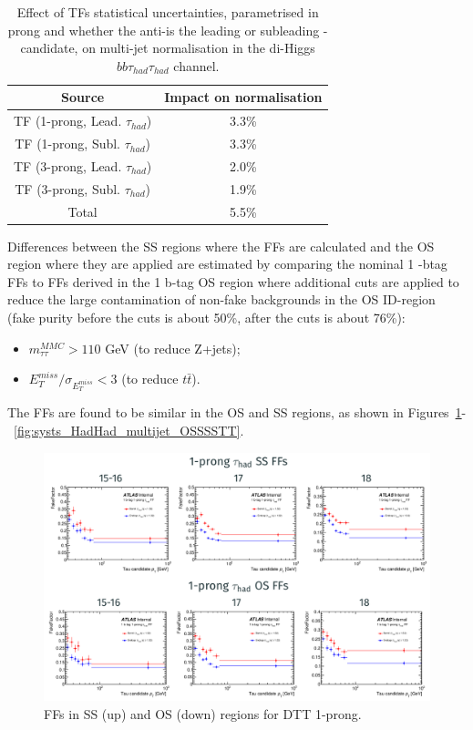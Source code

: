 \begin{table}
\centering
\small
\begin{tabular}{|c|c|}
\hline
Source & Impact on normalisation\\
\hline
TF (1-prong, Lead. $\tau_{had}$) & 3.3\%\\
TF (1-prong, Subl. $\tau_{had}$) & 3.3\%\\
TF (3-prong, Lead. $\tau_{had}$) & 2.0\%\\
TF (3-prong, Subl. $\tau_{had}$) & 1.9\%\\
\hline
Total & 5.5\%\\
\hline
\end{tabular}
\caption{Effect of TFs statistical uncertainties, parametrised in \tauhad prong
  and whether the anti-\tauhad is the leading or subleading \tauhad-candidate,
  on multi-jet normalisation in the di-Higgs $bb\tau_{had}\tau_{had}$ channel. }
\label{sec:systs:tab:systematics_multijet_TFs}
\end{table}

Differences between the SS regions where the FFs are calculated and the OS
region where they are applied are estimated by comparing the nominal 1 -btag FFs
to FFs derived in the 1 b-tag OS region where additional cuts are applied to
reduce the large contamination of non-fake backgrounds in the OS ID-region (fake
purity before the cuts is about 50\%, after the cuts is about 76\%):
\begin{itemize}
\item $m_{\tau\tau}^{MMC}>110$ GeV (to reduce Z+jets);
\item $E_{T}^{miss}/\sigma_{E_T^{miss}}<3$ (to reduce $t\bar{t}$).
\end{itemize}
The FFs are found to be similar in the OS and SS regions, as shown in
Figures~\ref{fig:systs_HadHad_multijet_OSSSDTT1P}-~\ref{fig:systs_HadHad_multijet_OSSSSTT}.

\begin{figure}[h]
  \centering

  \includegraphics[width=.85\textwidth]{figures/systs/hadhad_multijet/OSSS_DTT1P}
  \caption{FFs in SS (up) and OS (down) regions for DTT 1-prong.}

  \label{fig:systs_HadHad_multijet_OSSSDTT1P}
\end{figure}


